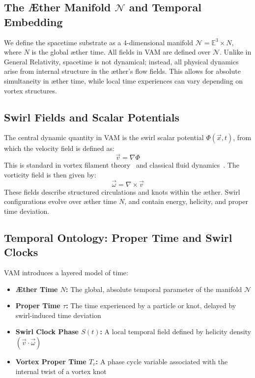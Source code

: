 \documentclass[preprint]{revtex4-2}
\begin{document}
    \subsection{The Æther Manifold $\mathcal{N}$ and Temporal Embedding}
    We define the spacetime substrate as a 4-dimensional manifold $\mathcal{N} = \mathbb{E}^3 \times N$, where $N$ is the global æther time. All fields in VAM are defined over $\mathcal{N}$. Unlike in General Relativity, spacetime is not dynamical; instead, all physical dynamics arise from internal structure in the æther's flow fields. This allows for absolute simultaneity in æther time, while local time experiences can vary depending on vortex structures.

    \subsection{Swirl Fields and Scalar Potentials}
    The central dynamic quantity in VAM is the swirl scalar potential $\Phi(\vec{x},t)$, from which the velocity field is defined as:
    \begin{equation}
        \vec{v} = \nabla \Phi
        \label{eq:velocity_from_potential}
    \end{equation}
    This is standard in vortex filament theory~\cite{saffman1992vortex} and classical fluid dynamics~\cite{batchelor2000introduction}.
    The vorticity field is then given by:
    \begin{equation}
        \vec{\omega} = \nabla \times \vec{v}
        \label{eq:vorticity_definition}
    \end{equation}
    These fields describe structured circulations and knots within the æther. Swirl configurations evolve over æther time $N$, and contain energy, helicity, and proper time deviation.

    \subsection{Temporal Ontology: Proper Time and Swirl Clocks}
    VAM introduces a layered model of time:
    \begin{itemize}
        \item \textbf{Æther Time \boldsymbol\(N\):} The global, absolute temporal parameter of the manifold $\mathcal{N}$
        \item \textbf{Proper Time \boldsymbol\(\tau\):} The time experienced by a particle or knot, delayed by swirl-induced time deviation
        \item \textbf{Swirl Clock Phase \boldsymbol\(S(t)\):} A local temporal field defined by helicity density $(\vec{v} \cdot \vec{\omega})$
        \item \textbf{Vortex Proper Time \boldsymbol\(T_v\):} A phase cycle variable associated with the internal twist of a vortex knot
    \end{itemize}
\end{document}

